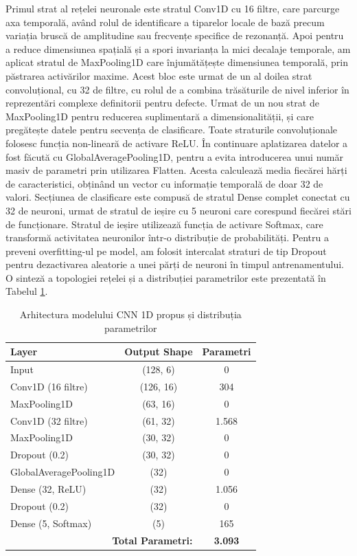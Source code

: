 	Primul strat al rețelei neuronale este stratul Conv1D cu 16 filtre, care parcurge axa temporală, având rolul de identificare a tiparelor locale de bază precum variația bruscă de amplitudine sau frecvențe specifice de rezonanță. Apoi pentru a reduce dimensiunea spațială și a spori invarianța la mici decalaje temporale, am aplicat stratul de MaxPooling1D care înjumătățește dimensiunea temporală, prin păstrarea activărilor maxime. Acest bloc este urmat de un al doilea strat convoluțional, cu 32 de filtre, cu rolul de a combina trăsăturile de nivel inferior în reprezentări complexe definitorii pentru defecte. Urmat de un nou strat de MaxPooling1D pentru reducerea suplimentară a dimensionalității, și care pregătește datele pentru secvența de clasificare. Toate straturile convoluționale folosesc funcția non-lineară de activare ReLU. În continuare aplatizarea datelor a fost făcută cu GlobalAveragePooling1D, pentru a evita introducerea unui număr masiv de parametri prin utilizarea Flatten. Acesta calculează media fiecărei hărți de caracteristici, obținând un vector cu informație temporală de doar 32 de valori. Secțiunea de clasificare este compusă de stratul Dense complet conectat cu 32 de neuroni, urmat de stratul de ieșire cu 5 neuroni care corespund fiecărei stări de funcționare. Stratul de ieșire utilizează funcția de activare Softmax, care transformă activitatea neuronilor într-o distribuție de probabilități. Pentru a preveni overfitting-ul pe model, am folosit intercalat straturi de tip Dropout pentru dezactivarea aleatorie a unei părți de neuroni în timpul antrenamentului. \cite{abadi:tensorflow} O sinteză a topologiei rețelei și a distribuției parametrilor este prezentată în Tabelul \ref{tab:cnn_architecture}.
	
	\begin{table}[htbp]
		\centering
		\caption{Arhitectura modelului CNN 1D propus și distribuția parametrilor}
		\setlength{\tabcolsep}{4pt}
		\begin{tabular}{|l|c|c|}
			\hline
			\textbf{Layer} & \textbf{Output Shape} & \textbf{Parametri} \\ \hline
			Input & (128, 6) & 0 \\ \hline
			Conv1D (16 filtre) & (126, 16) & 304 \\ \hline
			MaxPooling1D & (63, 16) & 0 \\ \hline
			Conv1D (32 filtre) & (61, 32) & 1.568 \\ \hline
			MaxPooling1D & (30, 32) & 0 \\ \hline
			Dropout (0.2) & (30, 32) & 0 \\ \hline
			GlobalAveragePooling1D & (32) & 0 \\ \hline
			Dense (32, ReLU) & (32) & 1.056 \\ \hline
			Dropout (0.2) & (32) & 0 \\ \hline
			Dense (5, Softmax) & (5) & 165 \\ \hline
			\multicolumn{2}{|r|}{\textbf{Total Parametri:}} & \textbf{3.093} \\ \hline
		\end{tabular}
		\label{tab:cnn_architecture}
	\end{table}
	
